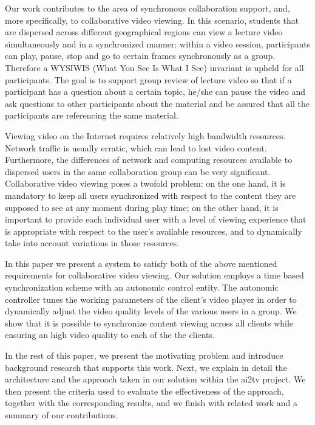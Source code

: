 \documentclass{sig-alternate}
\begin{document}

Our work contributes to the area of synchronous collaboration support,
and, more specifically, to collaborative video viewing.  In this
scenario, students that are dispersed across different geographical
regions can view a lecture video simultaneously and in a synchronized
manner: within a video session, participants can play, pause, stop and
go to certain frames synchronously as a group.  Therefore a WYSIWIS
(What You See Is What I See) invariant is upheld for all participants.
The goal is to support group review of lecture video so that if a
participant has a question about a certain topic, he/she can pause the
video and ask questions to other participants about the material and
be assured that all the participants are referencing the same
material.

Viewing video on the Internet requires relatively high bandwidth
resources.  Network traffic is usually erratic, which can lead to lost
video content.  Furthermore, the differences of network and computing
resources available to dispersed users in the same collaboration group
can be very significant.  Collaborative video viewing poses a twofold
problem: on the one hand, it is mandatory to keep all users
synchronized with respect to the content they are supposed to see at
any moment during play time; on the other hand, it is important to
provide each individual user with a level of viewing experience that
is appropriate with respect to the user's available resources, and to
dynamically take into account variations in those resources.

In this paper we present a system to satisfy both of the above
mentioned requirements for collaborative video viewing.  Our solution
employs a time based synchronization scheme with an autonomic control
entity.  The autonomic controller tunes the working parameters of the
client's video player in order to dynamically adjust the video quality
levels of the various users in a group.  We show that it is possible
to synchronize content viewing across all clients while ensuring an
high video quality to each of the the clients.

In the rest of this paper, we present the motivating problem and
introduce background research that supports this work.  Next, we
explain in detail the architecture and the approach taken in our
solution within the ai2tv project.  We then present the criteria used
to evaluate the effectiveness of the approach, together with the
corresponding results, and we finish with related work and a summary
of our contributions.
\end{document}
